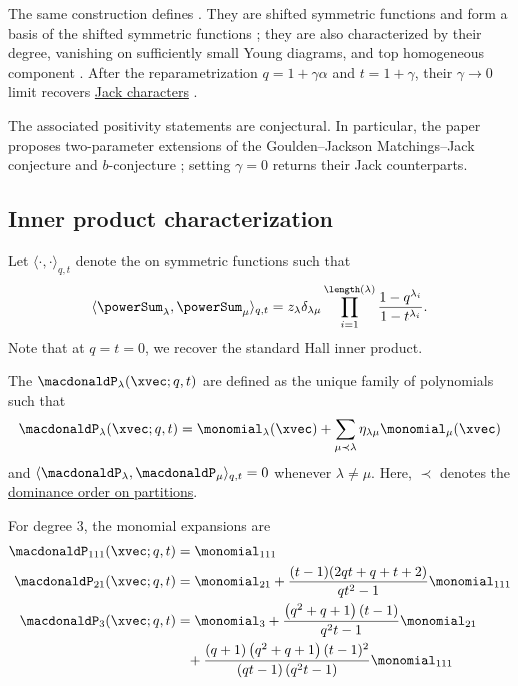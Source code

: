 The same construction defines
\label{macdonaldCharacter}.
They are shifted symmetric functions and form a basis of the shifted symmetric
functions \cite[Thm.~1.5 and Cor.~4.4]{DaliDAdderio2024x}; they are also
characterized by their degree, vanishing on sufficiently small Young diagrams,
and top homogeneous component \cite[Thm.~4.5]{DaliDAdderio2024x}.
After the reparametrization $q=1+\gamma\alpha$ and $t=1+\gamma$, their
$\gamma\to0$ limit recovers \hyperref[jackCharacters]{Jack characters}
\cite[Prop.~5.4]{DaliDAdderio2024x}.

The associated positivity statements are conjectural.  In particular, the
paper proposes two-parameter extensions of the Goulden--Jackson
Matchings--Jack conjecture and $b$-conjecture
\cite[Conjs.~7--8]{DaliDAdderio2024x}; setting $\gamma=0$ returns their Jack
counterparts.


\subsection[macdonaldPUniqueDefinition]{Inner product characterization}

Let $\langle \cdot , \cdot \rangle_{q,t}$ denote the
\label{macdonaldInnerProduct} on symmetric
functions such that
\[
\langle \powerSum_\lambda , \powerSum_\mu \rangle_{q,t}
=
z_\lambda \delta_{\lambda\mu}
\prod_{i=1}^{\length(\lambda)}
\frac{1-q^{\lambda_i}}{1-t^{\lambda_i}} .
\]
Note that at $q=t=0$, we recover the standard Hall inner product.

The \label{macdonaldPolynomialDefinition}
$\macdonaldP_\lambda(\xvec;q,t)$ are
defined as the unique family of polynomials
such that
\begin{equation*}
\macdonaldP_\lambda(\xvec;q,t) =
\monomial_\lambda(\xvec) + \sum_{\mu \prec \lambda}
\eta_{\lambda\mu} \monomial_\mu(\xvec)
\end{equation*}
and $\langle \macdonaldP_\lambda, \macdonaldP_\mu \rangle_{q,t}=0$
whenever $\lambda \neq \mu$.
Here, $\prec$ denotes the \hyperref[dominanceOrder]{dominance order on partitions}.

\begin{example*}
For degree $3$, the monomial expansions are
\begin{align*}
\macdonaldP_{111}(\xvec;q,t) &= \monomial_{111} \\
\macdonaldP_{21}(\xvec;q,t) &=
\monomial_{21}
+  \frac{(t-1) (2 q t+q+t+2)}{q t^2-1} \monomial_{111} \\
\macdonaldP_{3}(\xvec;q,t) &=
\monomial_{3}
+ \frac{\left(q^2+q+1\right)(t-1)}{q^2 t-1} \monomial_{21} \\
&\phantom{=}
+ \frac{(q+1) \left(q^2+q+1\right) (t-1)^2}
{(q t-1)\left(q^2 t-1\right)} \monomial_{111}
\end{align*}
\end{example*}

